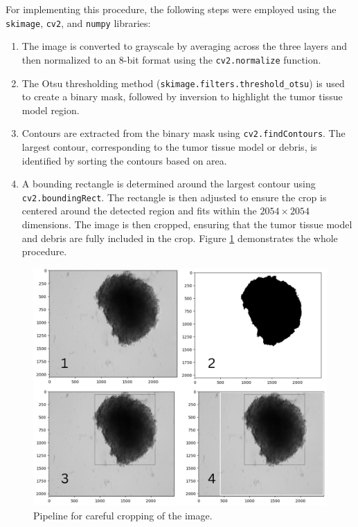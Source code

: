 \begin{enumerate}
For implementing this procedure, the following steps were employed using the \texttt{skimage}, \texttt{cv2}, and \texttt{numpy} libraries:
\begin{enumerate}[label=\arabic*.]
  \item The image is converted to grayscale by averaging across the three layers and then normalized to an 8-bit format using the \texttt{cv2.normalize} function.
  \item The Otsu thresholding method (\texttt{skimage.filters.threshold\_otsu}) is used to create a binary mask, followed by inversion to highlight the tumor tissue model region.
  \item Contours are extracted from the binary mask using \texttt{cv2.findContours}. The largest contour, corresponding to the tumor tissue model or debris, is identified by sorting the contours based on area.
  \item A bounding rectangle is determined around the largest contour using \texttt{cv2.boundingRect}. The rectangle is then adjusted to ensure the crop is centered around the detected region and fits within the  \(2054 \times 2054\) dimensions. The image is then cropped, ensuring that the tumor tissue model and debris are fully included in the crop. Figure \ref{fig:crop} demonstrates the whole procedure.
\end{enumerate}


\begin{figure}[H]
  \centering
  \includegraphics[scale=0.3]{figures/crop.png} 
  \caption{Pipeline for careful cropping of the image.}
  \label{fig:crop}
\end{figure}


\end{enumerate}
